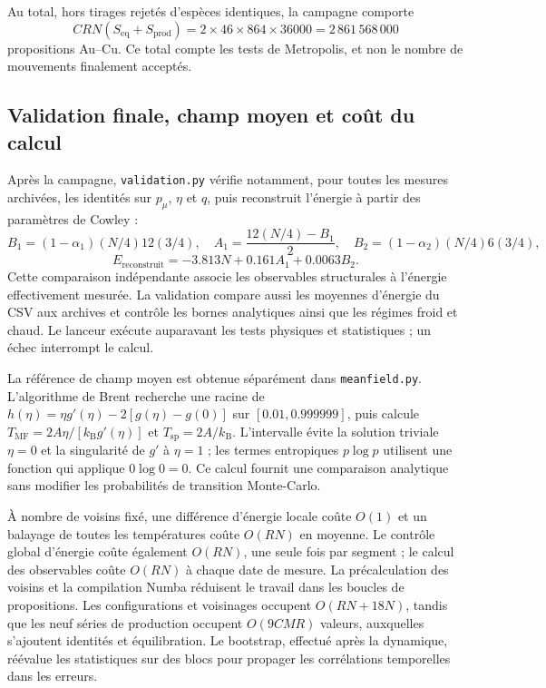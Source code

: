 \documentclass[10pt,a4paper]{article}
\newcommand{\kb}{k_{\mathrm B}}
\begin{document}
Au total, hors tirages rejetés d'espèces identiques, la campagne comporte
\[
C R N(S_{\mathrm{eq}}+S_{\mathrm{prod}})
=2\times46\times864\times36000
=2\,861\,568\,000
\]
propositions Au--Cu. Ce total compte les tests de Metropolis, et non le
nombre de mouvements finalement acceptés.

\subsection{Validation finale, champ moyen et coût du calcul}
Après la campagne, \texttt{validation.py} vérifie notamment, pour toutes
les mesures archivées, les identités sur $p_\mu$, $\eta$ et $q$, puis
reconstruit l'énergie à partir des paramètres de Cowley :
\[
B_1=(1-\alpha_1)(N/4)12(3/4),\quad
A_1=\frac{12(N/4)-B_1}{2},\quad
B_2=(1-\alpha_2)(N/4)6(3/4),
\]
\[
E_{\mathrm{reconstruit}}=-3.813N+0.161A_1+0.0063B_2.
\]
Cette comparaison indépendante associe les observables structurales à
l'énergie effectivement mesurée. La validation compare aussi les moyennes
d'énergie du CSV aux archives et contrôle les bornes analytiques ainsi que
les régimes froid et chaud. Le lanceur exécute auparavant les tests
physiques et statistiques ; un échec interrompt le calcul.

La référence de champ moyen est obtenue séparément dans
\texttt{meanfield.py}. L'algorithme de Brent recherche une racine de
$h(\eta)=\eta g'(\eta)-2[g(\eta)-g(0)]$ sur
$[0.01,0.999999]$, puis calcule
$T_{\mathrm{MF}}=2A\eta/[\kb g'(\eta)]$ et
$T_{\mathrm{sp}}=2A/\kb$. L'intervalle évite la solution triviale
$\eta=0$ et la singularité de $g'$ à $\eta=1$ ; les termes entropiques
$p\log p$ utilisent une fonction qui applique $0\log0=0$.
Ce calcul fournit une comparaison analytique sans modifier les probabilités
de transition Monte-Carlo.

À nombre de voisins fixé, une différence d'énergie locale coûte $O(1)$
et un balayage de toutes les températures coûte $O(RN)$ en moyenne.
Le contrôle global d'énergie coûte également $O(RN)$, une seule fois par
segment ; le calcul des observables coûte $O(RN)$ à chaque date de mesure.
La précalculation des voisins et la compilation Numba réduisent le travail
dans les boucles de propositions. Les configurations et voisinages
occupent $O(RN+18N)$, tandis que les neuf séries de production occupent
$O(9CMR)$ valeurs, auxquelles s'ajoutent identités et équilibration.
Le bootstrap, effectué après la dynamique, réévalue les statistiques sur
des blocs pour propager les corrélations temporelles dans les erreurs.
\end{document}
